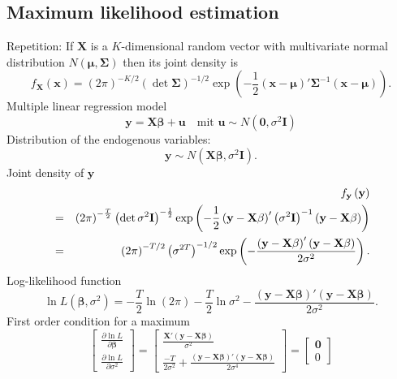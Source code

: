 \documentclass{article}
\begin{document}
\subsection*{Maximum likelihood estimation}

 Repetition: If $\mathbf{X}$ is a $K$-dimensional random vector with
multivariate normal distribution $N(\mathbf{\mu },\mathbf{\Sigma })$ then
its joint density is
\begin{equation*}
f_{\mathbf{X}}\left( \mathbf{x}\right) =\left( 2\pi \right) ^{-K/2}\left(
\det \mathbf{\Sigma }\right) ^{-1/2}\exp \left( -\frac{1}{2}\left( \mathbf{x}%
-\mathbf{\mu }\right) '\mathbf{\Sigma }^{-1}\left( \mathbf{x}-%
\mathbf{\mu }\right) \right).
\end{equation*}
Multiple linear regression model
\begin{equation*}
\mathbf{y}=\mathbf{X\beta }+\mathbf{u\quad }\text{mit }\mathbf{u}\sim
N\left( \mathbf{0},\sigma ^{2}\mathbf{I}\right)
\end{equation*}
Distribution of the endogenous variables: 
\[ \mathbf{y}\sim N\left( \mathbf{X\beta },\sigma ^{2}\mathbf{I}\right). \]
Joint density of $\mathbf{y}$
\begin{eqnarray*}
&&f_{\mathbf{y}}\left( \mathbf{y}\right) \\
&=&\left( 2\pi \right) ^{-\frac{T}{2}}\left( \det \sigma ^{2}\mathbf{I}%
\right) ^{-\frac{1}{2}}\exp \left( -\frac{1}{2}\left( \mathbf{y}-\mathbf{%
X\beta }\right) '\left( \sigma ^{2}\mathbf{I}\right) ^{-1}\left( 
\mathbf{y}-\mathbf{X\beta }\right) \right) \\
&=&\left( 2\pi \right) ^{-T/2}\left( \sigma ^{2T}\right) ^{-1/2}\exp \left( -%
\frac{\left( \mathbf{y}-\mathbf{X\beta }\right) '\left( \mathbf{y}-%
\mathbf{X\beta }\right) }{2\sigma ^{2}}\right).
\end{eqnarray*}
Log-likelihood function
\begin{equation*}
\ln L\left( \mathbf{\beta },\sigma ^{2}\right) =-\frac{T}{2}\ln \left( 2\pi
\right) -\frac{T}{2}\ln \sigma ^{2}-\frac{\left( \mathbf{y}-\mathbf{X\beta }%
\right) '\left( \mathbf{y}-\mathbf{X\beta }\right) }{2\sigma ^{2}}.
\end{equation*}
First order condition for a maximum
\begin{equation*}
\left[ 
\begin{array}{c}
\frac{\partial \ln L}{\partial \mathbf{\beta }} \\[2ex] 
\frac{\partial \ln L}{\partial \sigma ^{2}}%
\end{array}%
\right] =\left[ 
\begin{array}{c}
\frac{\mathbf{X}'(\mathbf{y}-\mathbf{X}\mathbf{\beta })}{\sigma^2} \\[2ex] 
\frac{-T}{2\sigma^2}+\frac{(\mathbf{y}-\mathbf{X\beta })'(\mathbf{y}-\mathbf{X\beta })}{2\sigma^4}\end{array}
\right] =\left[ 
\begin{array}{c}
\mathbf{0} \\ 0
\end{array}
\right]
\end{equation*}
\end{document}
